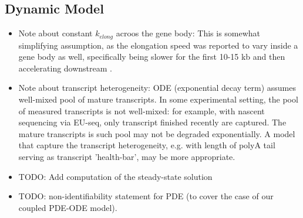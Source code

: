 \documentclass[11pt]{article}
\begin{document}
    \subsection*{Dynamic Model}
    
    \begin{itemize}
    	
    	\item Note about constant $k_{elong}$ acroos the gene body:  This is somewhat simplifying assumption, as the elongation speed was reported to vary inside a gene body as well, specifically being slower for the first 10-15 kb and then accelerating downstream \citep{munizRNAPolymeraseII2021}. 
    	
    	\item Note about transcript heterogeneity: ODE (exponential decay term) assumes well-mixed pool of mature transcripts. In some experimental setting, the pool of measured transcripts is not well-mixed: for example, with nascent sequencing via EU-seq, only transcript finished recently are captured. The mature transcripts is such pool may not be degraded exponentially. A model that capture the transcript heterogeneity, e.g. with length of polyA tail serving as transcript 'health-bar', may be more appropriate.
    	
    	\item TODO: Add computation of the steady-state solution
    	
    	\item TODO: non-identifiability statement for PDE (to cover the case of our coupled PDE-ODE model).
    	
    \end{itemize}
    
    
\end{document}
